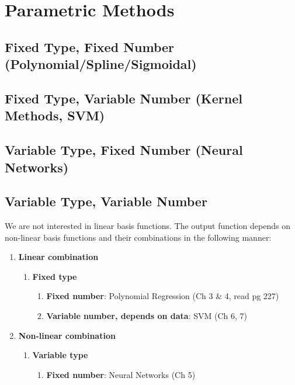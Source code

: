 \documentclass{book}
\begin{document}
\section{Parametric Methods}

\subsection{Fixed Type, Fixed Number (Polynomial/Spline/Sigmoidal)}


\subsection{Fixed Type, Variable Number (Kernel Methods, SVM)} 

\subsection{Variable Type, Fixed Number (Neural Networks)} 

\subsection{Variable Type, Variable Number } 
We are not interested in linear basis functions.
The output function depends on non-linear basis functions and their combinations in the following manner:

\begin{enumerate}
\item {\textbf{Linear combination}}
\begin{enumerate}
\item {\color{OliveGreen}\textbf{Fixed type}}
\begin{enumerate}
\item {\color{blue}\textbf{Fixed number}}: Polynomial Regression (Ch 3 \& 4, read pg 227) 
\item {\color{blue}\textbf{Variable number, depends on data}}: SVM (Ch 6, 7)
\end{enumerate}
\end{enumerate}
\item {\textbf{Non-linear combination}}
\begin{enumerate}
\item {\color{OliveGreen}\textbf{Variable type}}
\begin{enumerate}
\item {\color{blue}\textbf{Fixed number}}: Neural Networks (Ch 5)
\end{enumerate}
\end{enumerate}
\end{enumerate}






\cite{GaussProc_SimpleIntro}
\cite{BOOK_GMPL}



\nocite{*}
\printbibheading[title={Bibliography},heading=bibnumbered]
\printbibliography[title={Books},type=book,heading=subbibnumbered]
\printbibliography[title={Articles},type=article,heading=subbibnumbered]
\printbibliography[title={Web Pages},type=misc,heading=subbibnumbered]
\end{document}
